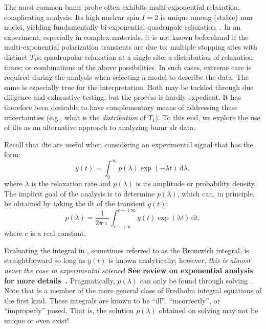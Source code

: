 \documentclass[
  aps,
  prb,
  twocolumn,
  reprint,
  superscriptaddress,
  floatfix,
  citeautoscript,
  longbibliography,
]{revtex4-2}
\newcommand{\latin}[1]{#1}
\begin{document}
The most common \gls{bnmr} probe  often exhibits multi-exponential relaxation, complicating analysis.
Its high nuclear spin $I = 2$ is unique among (stable) \gls{nmr} nuclei, yielding fundamentally bi-exponential quadrupole relaxation~\cite{1970-Hubbard-JCP-53-985, 1982-Becker-ZNA-37-697, 1985-Korblein-JPFMP-15-561}.
In an experiment, especially in complex materials, it is not known beforehand if the multi-exponential polarization transients are due to:
multiple  stopping sites with distinct $T_{1}$s;
quadrupolar relaxation at a single site;
a distribution of relaxation times;
or combinations of the above possibilities.
In such cases, extreme care is required during the analysis when selecting a model to describe the data.
The same is especially true for the interpretation.
Both may be tackled through due diligence and exhaustive testing, but the process is hardly expedient.
It has therefore been desirable to have complementary means of addressing these uncertainties (\latin{e.g.}, what is the \emph{distribution} of $T_{1}$).
To this end, we explore the use of \glspl{ilt} as an alternative approach to analyzing  \gls{bnmr} \gls{slr} data.

Recall that \glspl{ilt} are useful when considering an experimental signal that has the form:
\begin{equation}
\label{eq:signal-integral}
   y(t) = \int_{0}^{\infty} p(\lambda) \exp ( - \lambda t) \, \mathrm{d} \lambda,
\end{equation}
where $\lambda$ is the relaxation rate and $p ( \lambda )$ is its amplitude or probability density.
The implicit goal of the analysis is to determine $p ( \lambda )$, which can, in principle, be obtained by taking the \gls{ilt} of the transient $y(t)$:
\begin{equation}
\label{eq:ilt}
   p ( \lambda ) = \frac{1}{2 \pi \imath} \int_{c - \imath \infty}^{c + \imath \infty} y(t) \exp ( \lambda t ) \, \mathrm{d} t ,
\end{equation}
where $c$ is a real constant.

Evaluating the integral in , sometimes referred to as the Bromwich integral, is straightforward so long as $y(t)$ is known analytically;
however, \emph{this is almost never the case in experimental science}!
\textbf{See review on exponential analysis for more details~\cite{1999-Istratov-RSI-70-1233}.}
Pragmatically, $p ( \lambda )$ can only be found through solving .
Note that  is a member of the more general class of Fredholm integral equations of the first kind.
These integrals are known to be ``ill'', ``incorrectly'', or ``improperly'' posed.
That is, the solution $p ( \lambda )$ obtained on solving  may not be unique or even exist!
\end{document}
